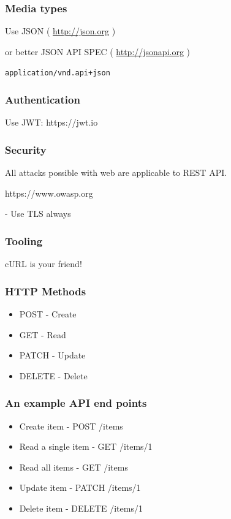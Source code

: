 \documentclass[aspectratio=169]{beamer}
\begin{document}
\begin{frame}[fragile]
  \frametitle{Media types}

  Use JSON ( \url{http://json.org} )

  or better JSON API SPEC ( \url{http://jsonapi.org} )

  \texttt{application/vnd.api+json}
  
\end{frame}

\begin{frame}[fragile]
  \frametitle{Authentication}

  Use JWT: https://jwt.io
  
\end{frame}

\begin{frame}[fragile]
  \frametitle{Security}

  All attacks possible with web are applicable to REST API.
  
  https://www.owasp.org

  - Use TLS always
  
\end{frame}

\begin{frame}[fragile]
  \frametitle{Tooling}

  cURL is your friend!
  
\end{frame}


\begin{frame}[fragile]
  \frametitle{HTTP Methods}

  \begin{itemize}
  \item POST - Create
  \item GET - Read
  \item PATCH - Update
  \item DELETE - Delete
  \end{itemize}
  
\end{frame}

\begin{frame}[fragile]
  \frametitle{An example API end points}

  \begin{itemize}
  \item Create item - POST /items
  \item Read a single item - GET /items/1
  \item Read all items - GET /items
  \item Update item - PATCH /items/1
  \item Delete item - DELETE /items/1
  \end{itemize}

\end{frame}
\end{document}
